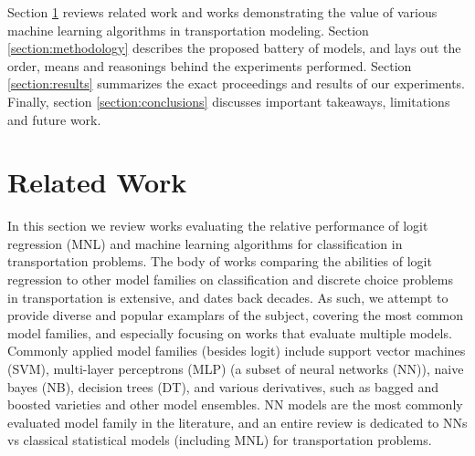 \documentclass[conference]{IEEEtran}
\begin{document}
Section \ref{section:related_work} reviews related work and works demonstrating the value of various machine learning algorithms in transportation modeling.
Section \ref{section:methodology} describes the proposed battery of models, and lays out the order, means and reasonings behind the experiments performed.
Section \ref{section:results} summarizes the exact proceedings and results of our experiments.
Finally, section \ref{section:conclusions} discusses important takeaways, limitations and future work.

\section{Related Work}\label{section:related_work}

In this section we review works evaluating the relative performance of logit regression (MNL) and machine learning algorithms for classification in transportation problems.
 The body of works comparing the abilities of logit regression to other model families on classification and discrete choice problems in transportation is extensive, and dates back decades.
 As such, we attempt to provide diverse and popular examplars of the subject, covering the most common model families, and especially focusing on works that evaluate multiple models.
 Commonly applied model families (besides logit) include support vector machines (SVM), multi-layer perceptrons (MLP) (a subset of neural networks (NN)), naive bayes (NB), decision trees (DT), and various derivatives, such as bagged and boosted varieties and other model ensembles.
 NN models are the most commonly evaluated model family in the literature, and an entire review \cite{karlaftis2011statistical} is dedicated to NNs vs classical statistical models (including MNL) for transportation problems.
\end{document}

